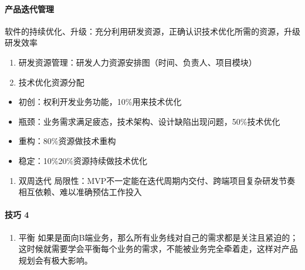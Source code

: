 \documentclass[letterpaper,11pt,english]{sphinxmanual}
\begin{document}
\paragraph{产品迭代管理}
\label{\detokenize{chapter_skill/upgrade_manage:id14}}
软件的持续优化、升级：充分利用研发资源，正确认识技术优化所需的资源，升级研发效率
\begin{enumerate}
%
\item {} 
研发资源管理：研发人力资源安排图（时间、负责人、项目模块）

\item {} 
技术优化资源分配

\end{enumerate}
\begin{itemize}
\item {} 
初创：权利开发业务功能，10\%用来技术优化

\item {} 
瓶颈：业务需求满足疲态，技术架构、设计缺陷出现问题，50\%技术优化

\item {} 
重构：80\%资源做技术重构

\item {} 
稳定：10\%\sphinxhyphen{}20\%资源持续做技术优化

\end{itemize}
\begin{enumerate}
%
\item {} 
双周迭代
局限性：MVP不一定能在迭代周期内交付、跨端项目复杂研发节奏相互依赖、难以准确预估工作投入

\end{enumerate}


\paragraph{技巧 4\sphinxfootnotemark[194]}
\label{\detokenize{chapter_skill/upgrade_manage:id15}}%
\begin{footnotetext}[194]\sphinxAtStartFootnote
{}
%
\end{footnotetext}\ignorespaces \begin{enumerate}
%
\item {} 
平衡
如果是面向B端业务，那么所有业务线对自己的需求都是关注且紧迫的；这时候就需要学会平衡每个业务的需求，不能被业务完全牵着走，这样对产品规划会有极大影响。

\end{enumerate}
\end{document}
